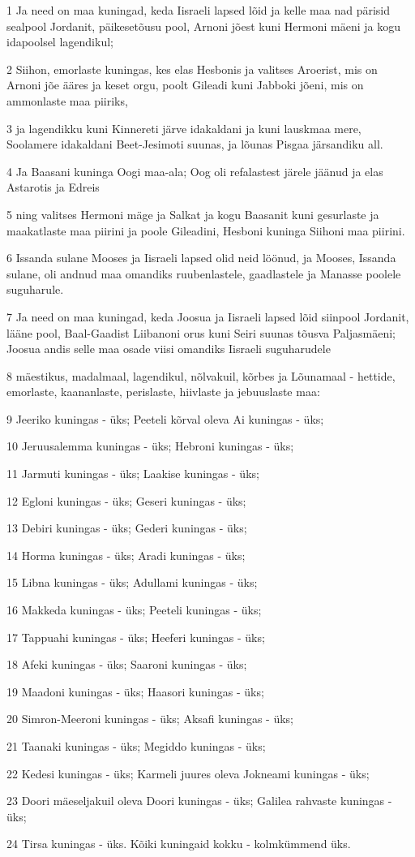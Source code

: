 \par 1 Ja need on maa kuningad, keda Iisraeli lapsed lõid ja kelle maa nad pärisid sealpool Jordanit, päikesetõusu pool, Arnoni jõest kuni Hermoni mäeni ja kogu idapoolsel lagendikul;
\par 2 Siihon, emorlaste kuningas, kes elas Hesbonis ja valitses Aroerist, mis on Arnoni jõe ääres ja keset orgu, poolt Gileadi kuni Jabboki jõeni, mis on ammonlaste maa piiriks,
\par 3 ja lagendikku kuni Kinnereti järve idakaldani ja kuni lauskmaa mere, Soolamere idakaldani Beet-Jesimoti suunas, ja lõunas Pisgaa järsandiku all.
\par 4 Ja Baasani kuninga Oogi maa-ala; Oog oli refalastest järele jäänud ja elas Astarotis ja Edreis
\par 5 ning valitses Hermoni mäge ja Salkat ja kogu Baasanit kuni gesurlaste ja maakatlaste maa piirini ja poole Gileadini, Hesboni kuninga Siihoni maa piirini.
\par 6 Issanda sulane Mooses ja Iisraeli lapsed olid neid löönud, ja Mooses, Issanda sulane, oli andnud maa omandiks ruubenlastele, gaadlastele ja Manasse poolele suguharule.
\par 7 Ja need on maa kuningad, keda Joosua ja Iisraeli lapsed lõid siinpool Jordanit, lääne pool, Baal-Gaadist Liibanoni orus kuni Seiri suunas tõusva Paljasmäeni; Joosua andis selle maa osade viisi omandiks Iisraeli suguharudele
\par 8 mäestikus, madalmaal, lagendikul, nõlvakuil, kõrbes ja Lõunamaal - hettide, emorlaste, kaananlaste, perislaste, hiivlaste ja jebuuslaste maa:
\par 9 Jeeriko kuningas - üks; Peeteli kõrval oleva Ai kuningas - üks;
\par 10 Jeruusalemma kuningas - üks; Hebroni kuningas - üks;
\par 11 Jarmuti kuningas - üks; Laakise kuningas - üks;
\par 12 Egloni kuningas - üks; Geseri kuningas - üks;
\par 13 Debiri kuningas - üks; Gederi kuningas - üks;
\par 14 Horma kuningas - üks; Aradi kuningas - üks;
\par 15 Libna kuningas - üks; Adullami kuningas - üks;
\par 16 Makkeda kuningas - üks; Peeteli kuningas - üks;
\par 17 Tappuahi kuningas - üks; Heeferi kuningas - üks;
\par 18 Afeki kuningas - üks; Saaroni kuningas - üks;
\par 19 Maadoni kuningas - üks; Haasori kuningas - üks;
\par 20 Simron-Meeroni kuningas - üks; Aksafi kuningas - üks;
\par 21 Taanaki kuningas - üks; Megiddo kuningas - üks;
\par 22 Kedesi kuningas - üks; Karmeli juures oleva Jokneami kuningas - üks;
\par 23 Doori mäeseljakuil oleva Doori kuningas - üks; Galilea rahvaste kuningas - üks;
\par 24 Tirsa kuningas - üks. Kõiki kuningaid kokku - kolmkümmend üks.

